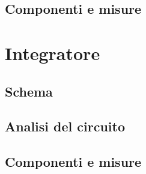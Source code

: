 \subsection{Componenti e misure} 
\section{Integratore} 
\subsection{Schema} 
\subsection{Analisi del circuito} 
\subsection{Componenti e misure} 








